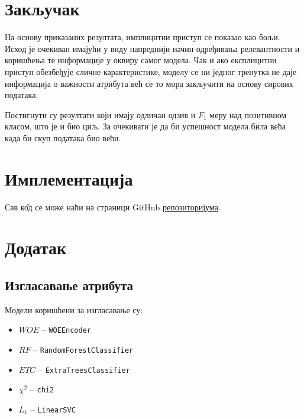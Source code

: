 \documentclass[12pt, a4paper]{article}
\begin{document}
\section{Закључак}
	На основу приказаних резултата, имплицитни приступ се показао као бољи. Исход је очекиван имајући у виду напреднији начин одређивања релевантности и коришћења те информације у оквиру самог модела. Чак и ако експлицитни приступ обезбеђује сличне карактеристике, моделу се ни једног тренутка не даје информација о важности атрибута већ се то мора закључити на основу сирових података.
	
	Постигнути су резултати који имају одличан одзив и $F_1$ меру над позитивном класом, што је и био циљ. За очекивати је да би успешност модела била већа када би скуп података био већи.

\section{Имплементација}
	Сав к\^{о}д се може наћи на страници GitHub \hyperref{http://www.github.com/4eyes4u/HRAnalytics}{category}{name}{репозиторијума}.

\section{Додатак}
	\subsection{Изгласавање атрибута}
		Модели коришћени за изгласавање су:
		\begin{itemize}
			\item $WOE$ -- \texttt{WOEEncoder}
			\item $RF$ -- \texttt{RandomForestClassifier}
			\item $ETC$ -- \texttt{ExtraTreesClassifier}
			\item $\chi^2$ -- \texttt{chi2}
			\item $L_1$ -- \texttt{LinearSVC}
		\end{itemize}
\end{document}
